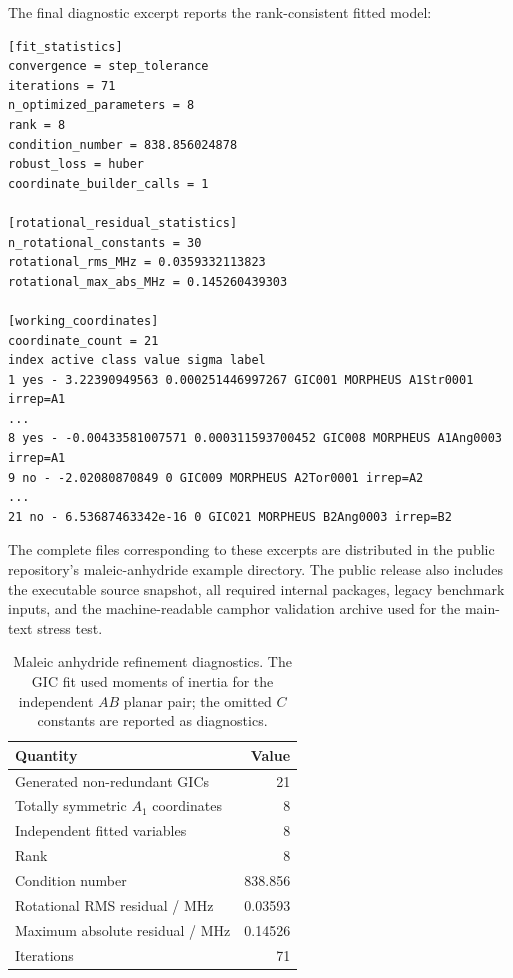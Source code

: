 \documentclass[12pt]{article}
\begin{document}
The final diagnostic excerpt reports the rank-consistent fitted model:
\begin{lstlisting}
[fit_statistics]
convergence = step_tolerance
iterations = 71
n_optimized_parameters = 8
rank = 8
condition_number = 838.856024878
robust_loss = huber
coordinate_builder_calls = 1

[rotational_residual_statistics]
n_rotational_constants = 30
rotational_rms_MHz = 0.0359332113823
rotational_max_abs_MHz = 0.145260439303

[working_coordinates]
coordinate_count = 21
index active class value sigma label
1 yes - 3.22390949563 0.000251446997267 GIC001 MORPHEUS A1Str0001 irrep=A1
...
8 yes - -0.00433581007571 0.000311593700452 GIC008 MORPHEUS A1Ang0003 irrep=A1
9 no - -2.02080870849 0 GIC009 MORPHEUS A2Tor0001 irrep=A2
...
21 no - 6.53687463342e-16 0 GIC021 MORPHEUS B2Ang0003 irrep=B2
\end{lstlisting}

The complete files corresponding to these excerpts are distributed in the
public repository's maleic-anhydride example directory.
The public release also includes the executable source snapshot, all required
internal packages, legacy benchmark inputs, and the machine-readable camphor
validation archive used for the main-text stress test.

\FloatBarrier
\begin{table}
\caption{Maleic anhydride refinement diagnostics. The GIC fit used moments of
inertia for the independent $AB$ planar pair; the omitted $C$ constants are
reported as diagnostics.}
\label{tab:si-maleic-diagnostics}
\begin{tabular}{lr}
\toprule
Quantity & Value \\
\midrule
Generated non-redundant GICs & 21 \\
Totally symmetric $A_1$ coordinates & 8 \\
Independent fitted variables & 8 \\
Rank & 8 \\
Condition number & 838.856 \\
Rotational RMS residual / MHz & 0.03593 \\
Maximum absolute residual / MHz & 0.14526 \\
Iterations & 71 \\
\bottomrule
\end{tabular}
\end{table}
\end{document}
